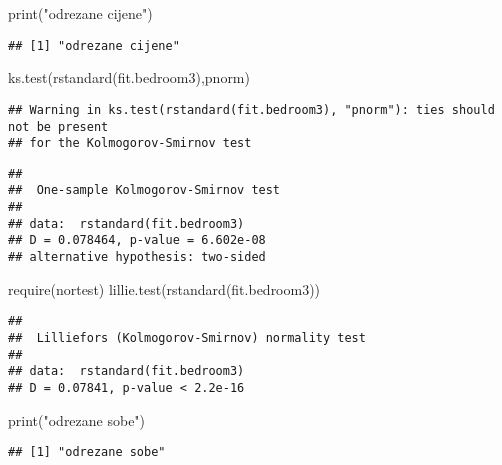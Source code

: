 \documentclass[
]{article}
\newenvironment{Shaded}{\begin{snugshade}}{\end{snugshade}}
\newcommand{\FunctionTok}[1]{\textcolor[rgb]{0.00,0.00,0.00}{#1}}
\newcommand{\NormalTok}[1]{#1}
\newcommand{\StringTok}[1]{\textcolor[rgb]{0.31,0.60,0.02}{#1}}
\begin{document}
\begin{Shaded}
\begin{Highlighting}[]
\FunctionTok{print}\NormalTok{(}\StringTok{"odrezane cijene"}\NormalTok{)}
\end{Highlighting}
\end{Shaded}

\begin{verbatim}
## [1] "odrezane cijene"
\end{verbatim}

\begin{Shaded}
\begin{Highlighting}[]
\FunctionTok{ks.test}\NormalTok{(}\FunctionTok{rstandard}\NormalTok{(fit.bedroom3),}\StringTok{\textquotesingle{}pnorm\textquotesingle{}}\NormalTok{)}
\end{Highlighting}
\end{Shaded}

\begin{verbatim}
## Warning in ks.test(rstandard(fit.bedroom3), "pnorm"): ties should not be present
## for the Kolmogorov-Smirnov test
\end{verbatim}

\begin{verbatim}
## 
##  One-sample Kolmogorov-Smirnov test
## 
## data:  rstandard(fit.bedroom3)
## D = 0.078464, p-value = 6.602e-08
## alternative hypothesis: two-sided
\end{verbatim}

\begin{Shaded}
\begin{Highlighting}[]
\FunctionTok{require}\NormalTok{(nortest)}
\FunctionTok{lillie.test}\NormalTok{(}\FunctionTok{rstandard}\NormalTok{(fit.bedroom3))}
\end{Highlighting}
\end{Shaded}

\begin{verbatim}
## 
##  Lilliefors (Kolmogorov-Smirnov) normality test
## 
## data:  rstandard(fit.bedroom3)
## D = 0.07841, p-value < 2.2e-16
\end{verbatim}

\begin{Shaded}
\begin{Highlighting}[]
\FunctionTok{print}\NormalTok{(}\StringTok{"odrezane sobe"}\NormalTok{)}
\end{Highlighting}
\end{Shaded}

\begin{verbatim}
## [1] "odrezane sobe"
\end{verbatim}
\end{document}
